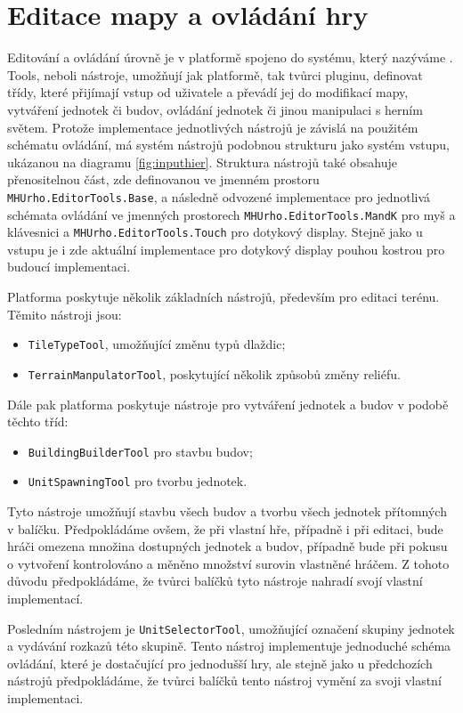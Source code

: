 \section{Editace mapy a ovládání hry}
Editování a ovládání úrovně je v platformě spojeno do systému, který nazýváme . Tools, neboli nástroje, umožňují jak platformě, tak tvůrci pluginu, definovat třídy, které přijímají vstup od uživatele a převádí jej do modifikací mapy, vytváření jednotek či budov, ovládání jednotek či jinou manipulaci s herním světem. Protože implementace jednotlivých nástrojů je závislá na použitém schématu ovládání, má systém nástrojů podobnou strukturu jako systém vstupu, ukázanou na diagramu \ref{fig:inputhier}. Struktura nástrojů také obsahuje přenositelnou část, zde definovanou ve jmenném prostoru \texttt{MHUrho.EditorTools.Base}, a následně odvozené implementace pro jednotlivá schémata ovládání ve jmenných prostorech \texttt{MHUrho.EditorTools.MandK} pro myš a klávesnici a \texttt{MHUrho.EditorTools.Touch} pro dotykový display. Stejně jako u vstupu je i zde aktuální implementace pro dotykový display pouhou kostrou pro budoucí implementaci.

Platforma poskytuje několik základních nástrojů, především pro editaci terénu. Těmito nástroji jsou:
\begin{itemize}
	\item \texttt{TileTypeTool}, umožňující změnu typů dlaždic;
	\item \texttt{TerrainManpulatorTool}, poskytující několik způsobů změny reliéfu.
\end{itemize} 

Dále pak platforma poskytuje nástroje pro vytváření jednotek a budov v podobě těchto tříd:
\begin{itemize}
	\item \texttt{BuildingBuilderTool} pro stavbu budov;
	\item \texttt{UnitSpawningTool} pro tvorbu jednotek.
\end{itemize} 
Tyto nástroje umožňují stavbu všech budov a tvorbu všech jednotek přítomných v balíčku. Předpokládáme ovšem, že při vlastní hře, případně i při editaci, bude hráči omezena množina dostupných jednotek a budov, případně bude při pokusu o vytvoření kontrolováno a měněno množství surovin vlastněné hráčem. Z tohoto důvodu předpokládáme, že tvůrci balíčků tyto nástroje nahradí svojí vlastní implementací.

Posledním nástrojem je \texttt{UnitSelectorTool}, umožňující označení skupiny jednotek a vydávání rozkazů této skupině. Tento nástroj implementuje jednoduché schéma ovládání, které je dostačující pro jednodušší hry, ale stejně jako u předchozích nástrojů předpokládáme, že tvůrci balíčků tento nástroj vymění za svoji vlastní implementaci.


